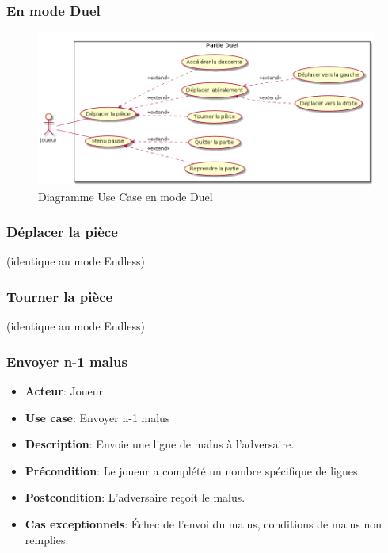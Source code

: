 \documentclass{article}
\begin{document}
\subsubsection{En mode Duel}

\begin{figure}[!h]
    \centering
    \includegraphics[width=1\textwidth]{uml/usescase/en-jeu/dual.png}
    \caption{Diagramme Use Case en mode Duel}
    \label{fig:Duel}
\end{figure}

\subsubsection*{Déplacer la pièce} (identique au mode Endless)

\subsubsection*{Tourner la pièce} (identique au mode Endless)

\subsubsection*{Envoyer n-1 malus}
\begin{itemize}
    \item \textbf{Acteur}: Joueur
    \item \textbf{Use case}: Envoyer n-1 malus
    \item \textbf{Description}: Envoie une ligne de malus à l'adversaire.
    \item \textbf{Précondition}: Le joueur a complété un nombre spécifique de lignes.
    \item \textbf{Postcondition}: L'adversaire reçoit le malus.
    \item \textbf{Cas exceptionnels}: Échec de l’envoi du malus, conditions de malus non remplies.
\end{itemize}
\end{document}
